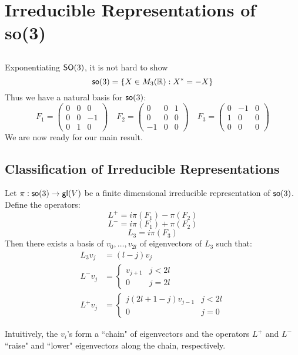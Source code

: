 \section{Irreducible Representations of so(3)}

\subsection{}
Exponentiating $\operatorname{\textsf{SO}}(3)$, it is not hard to show
\[
    \operatorname{\textsf{so}}(3) = \{X \in M_3({\mathbb R}): X^* = - X\}
\]
Thus we have a natural basis for $\operatorname{\textsf{so}}(3)$:
\[
    F_1 =
    \begin{pmatrix}
        0&0&0\\
        0&0&-1\\
        0&1&0
    \end{pmatrix}
    \quad
    F_2 = 
    \begin{pmatrix}
        0&0&1\\
        0&0&0\\
        -1&0&0
    \end{pmatrix}
    \quad
    F_3 =
    \begin{pmatrix}
        0&-1&0\\
        1&0&0\\
        0&0&0
    \end{pmatrix}
\]
We are now ready for our main result.

\subsection{Classification of Irreducible Representations}
\begin{thm}
    Let $\pi: \operatorname{\textsf{so}}(3) \rightarrow \operatorname{\textsf{gl}}(V)$ be a finite dimensional irreducible representation of $\operatorname{\textsf{so}}(3)$. Define the operators:
    \[
        L^+ = i\pi(F_1) - \pi(F_2)
    \]
    \[
        L^- = i\pi(F_1) + \pi(F_2)
    \]
    \[
        L_3 = i\pi(F_3)
    \]
    Then there exists a basis of $v_0, \dots, v_{2l}$ of eigenvectors of $L_3$ such that:
    \[
        \begin{split}
            L_3v_j &= (l - j )v_j\\
           L^- v_j &= 
        \begin{cases}
            v_{j+1} & j < 2l\\
            0   & j = 2l
        \end{cases}\\
           L^+ v_j &= 
        \begin{cases}
            j(2l + 1 - j)v_{j-1} & j < 2l\\
            0   & j = 0
        \end{cases}
        \end{split}
    \]
\end{thm}
Intuitively, the $v_i$'s form a ``chain" of eigenvectors and the operators $L^+$ and $L^-$ ``raise" and ``lower" eigenvectors along the chain, respectively.

